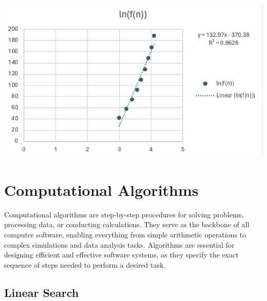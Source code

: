 \documentclass{article}
\begin{document}
\begin{minipage}{0.6\textwidth} %

    

    \centering
    \includegraphics[width=1\linewidth]{Graphs/n!.png} %

     
    
\end{minipage}

\newpage


\section{Computational Algorithms}

    Computational algorithms are step-by-step procedures for solving problems, processing data, or conducting calculations. They serve as the backbone of all computer software, enabling everything from simple arithmetic operations to complex simulations and data analysis tasks. Algorithms are essential for designing efficient and effective software systems, as they specify the exact sequence of steps needed to perform a desired task.

    \subsection{Linear Search}

    
\end{document}
